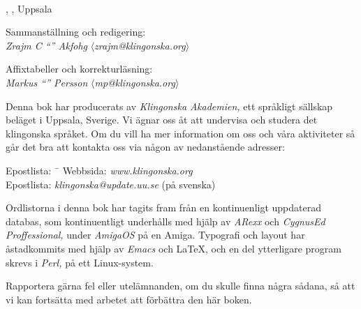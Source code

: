 \begin{center}
  \\
  \edition{}, \compiledate{}, Uppsala

  \vspace{4mm}
  \small Sammanställning och redigering: \\
  \textit{Zrajm C ``'' Akfohg}
  $\langle$\textit{zrajm@klingonska.org}$\rangle$ 

  \vspace{2mm}
  Affixtabeller och korrekturläsning:\\
  \textit{Markus ``'' Persson}
  $\langle$\textit{mp@klingonska.org}$\rangle$
\end{center}


\small\noindent Denna bok har producerats av \textit{Kling\-on\-ska
Aka\-demi\-en,} ett språkligt sällskap beläget i Uppsala, Sverige. Vi
ägnar oss åt att undervisa och studera det klingonska språket. Om du
vill ha mer information om oss och våra aktiviteter så går det bra att
kontakta oss via någon av nedanstående adresser:

\begin{tabbing}
\indent Epostlista: \ \= \kill
\indent Webbsida: \> \textit{www.klingonska.org}\\
\indent Epostlista: \> \textit{klingonska@update.uu.se} (på svenska)
\end{tabbing}

\noindent Ordlistorna i denna bok har tagits fram från en
kontinuenligt uppdaterad databas, som kontinuentligt underhålls med
hjälp av \textit{ARexx} och \textit{Cyg\-nus\-Ed Proffessional,} under
\textit{AmigaOS} på en Amiga. Typografi och layout har åstadkommits
med hjälp av \textit{Emacs} och \LaTeX, och en del ytterligare program
skrevs i \textit{Perl,} på ett Linux-system.

Rapportera gärna fel eller utelämnanden, om du skulle finna några
sådana, så att vi kan fortsätta med arbetet att förbättra den här
boken.

\newpage
\normalsize
